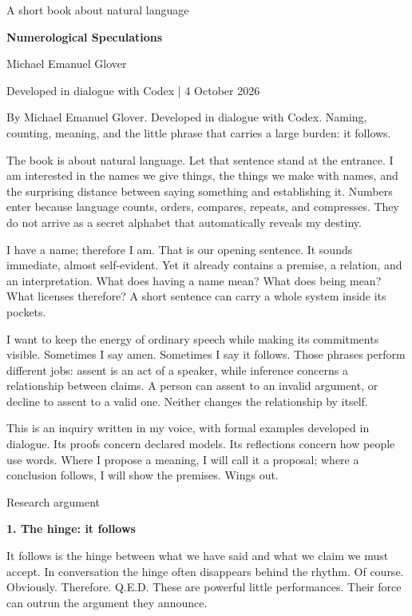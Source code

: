 \documentclass[10pt]{article}
\begin{document}
{\small\color{accent}A short book about natural language}\par
{\LARGE\bfseries\color{ink}Numerological Speculations}\par\vspace{7pt}
Michael Emanuel Glover\par Developed in dialogue with Codex | 4 October 2026\par\vspace{8pt}
By Michael Emanuel Glover. Developed in dialogue with Codex. Naming, counting, meaning, and the little phrase that carries a large burden: it follows.\par
The book is about natural language. Let that sentence stand at the entrance. I am interested in the names we give things, the things we make with names, and the surprising distance between saying something and establishing it. Numbers enter because language counts, orders, compares, repeats, and compresses. They do not arrive as a secret alphabet that automatically reveals my destiny.\par
I have a name; therefore I am. That is our opening sentence. It sounds immediate, almost self-evident. Yet it already contains a premise, a relation, and an interpretation. What does having a name mean? What does being mean? What licenses therefore? A short sentence can carry a whole system inside its pockets.\par
I want to keep the energy of ordinary speech while making its commitments visible. Sometimes I say amen. Sometimes I say it follows. Those phrases perform different jobs: assent is an act of a speaker, while inference concerns a relationship between claims. A person can assent to an invalid argument, or decline to assent to a valid one. Neither changes the relationship by itself.\par
This is an inquiry written in my voice, with formal examples developed in dialogue. Its proofs concern declared models. Its reflections concern how people use words. Where I propose a meaning, I will call it a proposal; where a conclusion follows, I will show the premises. Wings out.\par
\clearpage
{\small\color{accent}Research argument}\par
{\LARGE\bfseries\color{ink}1. The hinge: it follows}\par\vspace{7pt}
It follows is the hinge between what we have said and what we claim we must accept. In conversation the hinge often disappears behind the rhythm. Of course. Obviously. Therefore. Q.E.D. These are powerful little performances. Their force can outrun the argument they announce.\par
\end{document}

